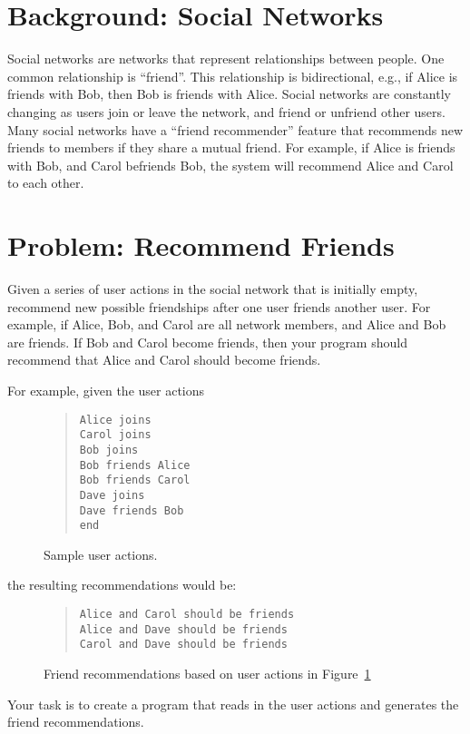 \documentclass[12pt,pdftex]{article}
\begin{document}
\section*{Background: Social Networks}
Social networks are networks that represent relationships between
people.  One common relationship is ``friend''.  This relationship
is bidirectional, e.g., if Alice is friends with Bob, then Bob is
friends with Alice.  Social networks are constantly changing as
users join or leave the network, and friend or unfriend other users.
Many social networks have a ``friend recommender'' feature that
recommends new friends to members if they share a mutual friend.
For example, if Alice is friends with Bob, and Carol befriends Bob,
the system will recommend Alice and Carol to each other. 


\section*{Problem: Recommend Friends}
Given a series of user actions in the social network that is initially empty, 
recommend new possible friendships after one user friends another user.
For example, if Alice, Bob, and Carol are all network members, and Alice
and Bob are friends.  If Bob and Carol become friends, then your program
should recommend that Alice and Carol should become friends.

For example, given the user actions 
\begin{figure}[h]
\begin{quote}
\begin{verbatim}
Alice joins
Carol joins
Bob joins
Bob friends Alice
Bob friends Carol
Dave joins
Dave friends Bob
end
\end{verbatim}
\end{quote}
\caption{Sample user actions.  \label{fig:input}}
\end{figure}
the resulting recommendations would be:
\begin{figure}[h]
\begin{quote}
\begin{verbatim}
Alice and Carol should be friends
Alice and Dave should be friends
Carol and Dave should be friends
\end{verbatim}
\end{quote}
\caption{Friend recommendations based on user actions in 
         Figure~\ref{fig:input}
         \label{fig:output}}
\end{figure}

Your task is to create a program that reads in the user actions and
generates the friend recommendations.
\end{document}
